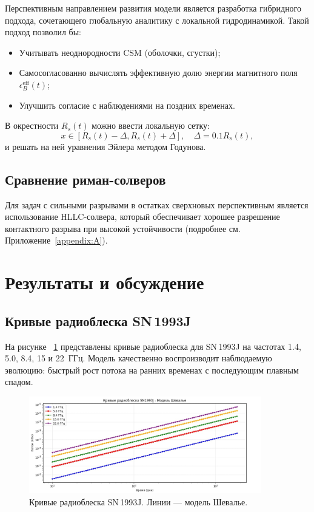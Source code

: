 \documentclass[a4paper,12pt]{extarticle}
\newcommand{\rs}{R_s}
\newcommand{\eeff}{\epsilon_B^{\text{eff}}}
\begin{document}
Перспективным направлением развития модели является разработка гибридного подхода, сочетающего глобальную аналитику с локальной гидродинамикой. Такой подход позволил бы:

\begin{itemize}
    \item Учитывать неоднородности CSM (оболочки, сгустки);
    \item Самосогласованно вычислять эффективную долю энергии магнитного поля $\eeff(t)$;
    \item Улучшить согласие с наблюдениями на поздних временах.
\end{itemize}

В окрестности $\rs(t)$ можно ввести локальную сетку:
\begin{equation}
    x \in [\rs(t) - \Delta, \rs(t) + \Delta], \quad \Delta = 0.1 \rs(t),
\end{equation}
и решать на ней уравнения Эйлера методом Годунова.

\subsection{Сравнение риман-солверов}

Для задач с сильными разрывами в остатках сверхновых перспективным является использование HLLC-солвера, который обеспечивает хорошее разрешение контактного разрыва при высокой устойчивости (подробнее см. Приложение~\ref{appendix:A}).

\section{Результаты и обсуждение}

\subsection{Кривые радиоблеска SN\,1993J}

На рисунке ~\ref{fig:sn1993j_lightcurves} представлены кривые радиоблеска для SN\,1993J на частотах 1.4, 5.0, 8.4, 15 и 22~ГГц. Модель качественно воспроизводит наблюдаемую эволюцию: быстрый рост потока на ранних временах с последующим плавным спадом.

\begin{figure}[h]
    \centering
    \includegraphics[width=0.9\textwidth]{sn1993j_lightcurves.jpg}
    \caption{Кривые радиоблеска SN\,1993J. Линии — модель Шевалье.}
    \label{fig:sn1993j_lightcurves}
\end{figure}
\newpage
\end{document}
